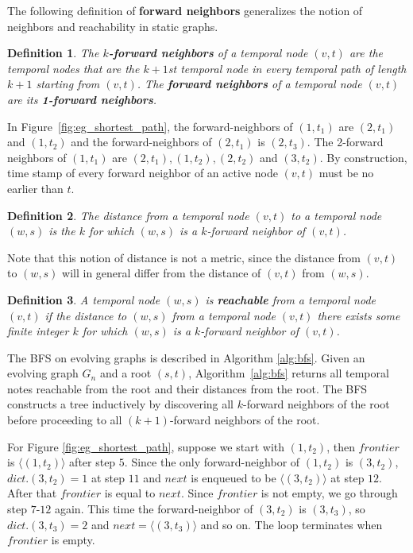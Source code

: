 \documentclass[11pt,conference,compsocconf]{IEEEtran}
\newtheorem{defn}{Definition}
\theoremstyle{definition}
\begin{document}
The following definition of \textbf{forward neighbors} generalizes the notion of
neighbors and reachability in static graphs.


\begin{defn}
The \textbf{$k$-forward neighbors} of a temporal node $(v, t)$ are the temporal nodes
that are the $k+1$st temporal node in every temporal path of length $k+1$ starting
from $(v, t)$. The \textbf{forward neighbors} of a temporal node $(v, t)$ are its
 \textbf{1-forward neighbors}.
\end{defn}

In Figure~\ref{fig:eg_shortest_path},
the forward-neighbors of $(1, t_1)$ are $(2, t_1)$ and $(1, t_2)$ and
the forward-neighbors of $(2, t_1)$ is $(2, t_3)$.
The 2-forward neighbors of $(1, t_1)$ are
$(2, t_1), (1, t_2), (2, t_2)$ and $(3, t_2)$.
By construction, time stamp of every forward neighbor of an active node $(v, t)$
must be no earlier than $t$.


\begin{defn}
The distance from a temporal node $(v, t)$ to a temporal node $(w, s)$ is
the $k$ for which $(w, s)$ is a $k$-forward neighbor of $(v, t)$.
\end{defn}

Note that this notion of distance is not a metric, since the distance from $(v, t)$
to $(w, s)$ will in general differ from the distance of $(v, t)$ from $(w, s)$.


\begin{defn}
A temporal node $(w, s)$ is \textbf{reachable} from a temporal node $(v, t)$ if
the distance to $(w, s)$ from a temporal node $(v, t)$ there exists some finite
integer $k$ for which $(w, s)$ is a $k$-forward neighbor of $(v, t)$.
\end{defn}


The BFS on evolving graphs is described in Algorithm \ref{alg:bfs}.
Given an evolving graph $G_n$ and a root $(s,t)$,
Algorithm~\ref{alg:bfs} returns all temporal notes reachable from the root and
their distances from the root.
The BFS constructs a tree inductively by discovering all $k$-forward neighbors
of the root before proceeding to all $(k+1)$-forward neighbors of the root.

For Figure \ref{fig:eg_shortest_path}, suppose we start with $(1, t_2)$, then
$frontier$ is $\langle(1,t_2)\rangle$ after step $5$.  Since the only forward-neighbor of
$(1,t_2)$ is $(3,t_2)$, $dict.(3,t_2) =1$ at step $11$ and $next$ is enqueued to be
$\langle (3,t_2) \rangle$ at step $12$. After that $frontier$ is equal to $next$. Since
$frontier$ is not empty, we go through step $7$-$12$ again. This time
the forward-neighbor of $(3,t_2)$ is $(3,t_3)$, so $dict.(3,t_3)=2$ and
$next = \langle (3,t_3) \rangle$ and so on. The loop terminates when $frontier$ is empty.
\end{document}
